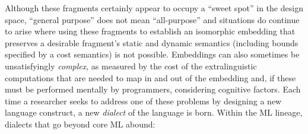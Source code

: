 \documentclass{llncs}
\begin{document}
Although these fragments certainly appear to occupy a ``sweet spot'' in the design space, ``general purpose'' does not mean ``all-purpose'' and situations do continue to arise where using these fragments to establish an isomorphic embedding that preserves a desirable fragment's  static and dynamic semantics (including bounds specified by a cost semantics) is not possible. 
Embeddings can also sometimes be unsatisfyingly \emph{complex}, as measured by the cost of the extralinguistic computations that are needed to map in and out of the embedding and, if these  must be performed mentally by programmers, considering  cognitive factors. %
Each time a researcher seeks to address one of these problems by designing a new language construct, a new \emph{dialect} of the language is born. Within the ML lineage, dialects that go  beyond core ML abound:
%
\end{document}
